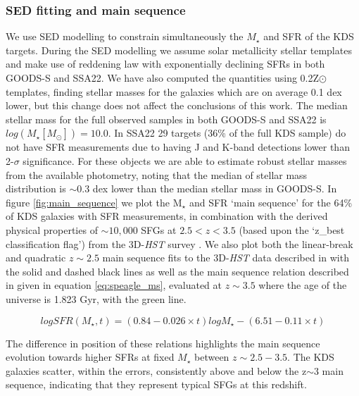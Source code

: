 \documentclass[fleqn,usenatbib]{mn2e}
\begin{document}
\subsubsection{SED fitting and main sequence}\label{subsubsec:sed_fitting}
We use SED modelling to constrain simultaneously the $M_{\star}$ and SFR of the KDS targets.
During the SED modelling we assume solar metallicity stellar templates and make use of \cite{Calzetti2000} reddening law with exponentially declining SFRs in both GOODS-S and SSA22.
We have also computed the quantities using 0.2Z$\odot$ templates, finding stellar masses for the galaxies which are on average 0.1 dex lower, but this change does not affect the conclusions of this work.
The median stellar mass for the full observed samples in both GOODS-S and SSA22 is $log(M_{\star}[M_{\odot}]) = 10.0$.
In SSA22 29 targets (36\% of the full KDS sample) do not have SFR measurements due to having J and K-band detections lower than 2-$\sigma$ significance.
For these objects we are able to estimate robust stellar masses from the available photometry, noting that the median of stellar mass distribution is $\sim 0.3$ dex lower than the median stellar mass in GOODS-S.
In figure \ref{fig:main_sequence} we plot the M$_{\star}$ and SFR `main sequence' for the 64\% of KDS galaxies with SFR measurements, in combination with the derived physical properties of $\sim 10,000$ SFGs at $2.5 < z < 3.5$  (based upon the `z\_best classification flag') from the 3D-{\em HST} survey \citep{Brammer2012,Momcheva2016}.
We also plot both the linear-break and quadratic $z\sim 2.5$ main sequence fits to the 3D-{\em HST} data described in \cite{Whitaker2014} with the solid and dashed black lines as well as the main sequence relation described in \cite{Speagle2014} given in equation \ref{eq:speagle_ms}, evaluated at $z\sim3.5$ where the age of the universe is 1.823 Gyr, with the green line.

\begin{equation}\label{eq:speagle_ms}
logSFR(M_{\star}, t) = (0.84 - 0.026 \times t)logM_{\star} - (6.51 - 0.11 \times t)
\end{equation}

The difference in position of these relations highlights the main sequence evolution towards higher SFRs at fixed $M_{\star}$ between $z\sim2.5-3.5$.
The KDS galaxies scatter, within the errors, consistently above and below the z$\sim3$ main sequence, indicating that they represent typical SFGs at this redshift.
\end{document}
